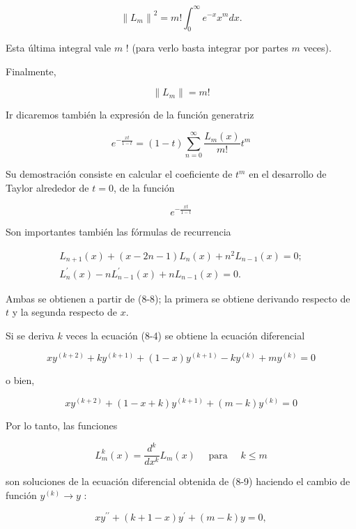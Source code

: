 \documentclass[10pt]{article}
\theoremstyle{plain}
\theoremstyle{definition}
\theoremstyle{remark}
\begin{document}
$$
\left\|L_{m}\right\|^{2}=m!\int_{0}^{\infty} e^{-x} x^{m} d x .
$$

Esta última integral vale $m$ ! (para verlo basta integrar por partes $m$ veces).

Finalmente,


\begin{equation*}
\left\|L_{m}\right\|=m! \tag{8-7}
\end{equation*}


Ir dicaremos también la expresión de la función generatriz


\begin{equation*}
e^{-\frac{x t}{1-t}}=(1-t) \sum_{n=0}^{\infty} \frac{L_{m}(x)}{m!} t^{m} \tag{8-8}
\end{equation*}


Su demostración consiste en calcular el coeficiente de $t^{m}$ en el desarrollo de Taylor alrededor de $t=0$, de la función

$$
e^{-\frac{x t}{1-t}}
$$

Son importantes también las fórmulas de recurrencia

$$
\begin{gathered}
L_{n+1}(x)+(x-2 n-1) L_{n}(x)+n^{2} L_{n-1}(x)=0 ; \\
L_{n}^{\prime}(x)-n L_{n-1}^{\prime}(x)+n L_{n-1}(x)=0 .
\end{gathered}
$$

Ambas se obtienen a partir de (8-8); la primera se obtiene derivando respecto de $t$ y la segunda respecto de $x$.

Si se deriva $k$ veces la ecuación (8-4) se obtiene la ecuación diferencial

$$
x y^{(k+2)}+k y^{(k+1)}+(1-x) y^{(k+1)}-k y^{(k)}+m y^{(k)}=0
$$

o bien,


\begin{equation*}
x y^{(k+2)}+(1-x+k) y^{(k+1)}+(m-k) y^{(k)}=0 \tag{8-9}
\end{equation*}


Por lo tanto, las funciones


\begin{equation*}
L_{m}^{k}(x)=\frac{d^{k}}{d x^{k}} L_{m}(x) \quad \text { para } \quad k \leqslant m \tag{8-10}
\end{equation*}


son soluciones de la ecuación diferencial obtenida de (8-9) haciendo el cambio de función $y^{(k)} \rightarrow y$ :


\begin{equation*}
x y^{\prime \prime}+(k+1-x) y^{\prime}+(m-k) y=0, \tag{8-11}
\end{equation*}
\end{document}
